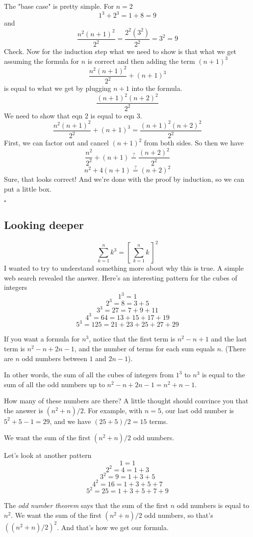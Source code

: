 \documentclass[11pt, oneside]{article}
\begin{document}
The "base case" is pretty simple.  For $n=2$
\[ 1^3 + 2^3 = 1 + 8 = 9 \]
and
\[ \frac{n^2(n+1)^2}{2^2} = \frac{2^2(3^2)}{2^2} = 3^2 = 9 \]
Check.  Now for the induction step what we need to show is that what we get assuming the formula for $n$ is correct and then adding the term $(n+1)^3$
\begin{equation}
\boxed{ \frac{n^2(n+1)^2}{2^2} + (n+1)^3}
\end{equation}
is equal to what we get by plugging $n+1$ into the formula.
\begin{equation}
\boxed{ \frac{(n+1)^2(n+2)^2}{2^2}}
\end{equation}
We need to show that eqn 2 is equal to eqn 3.  
\[ \frac{n^2(n+1)^2}{2^2} + (n+1)^3 = \frac{(n+1)^2(n+2)^2}{2^2} \]
First, we can factor out and cancel $(n+1)^2$ from both sides.  So then we have
\[ \frac{n^2}{2^2} + (n+1) \stackrel{?}{=} \frac{(n+2)^2}{2^2} \]
\[ n^2 + 4(n+1) \stackrel{?}{=} (n+2)^2 \]
Sure, that looks correct!  And we're done with the proof by induction, so we can put a little box.

$\square$

\subsection*{Looking deeper}
\[ \sum\limits_{k=1}^n k^3 = [\ \sum\limits_{k=1}^n k \ ] ^2 \]
I wanted to try to understand something more about why this is true.  A simple web search revealed the answer.  Here's an interesting pattern for the cubes of integers
\[ 1^3 = 1 \]
\[ 2^3 = 8 = 3 + 5 \]
\[ 3^3 = 27 = 7 + 9 + 11 \]
\[ 4^3 = 64 = 13 + 15 + 17 + 19 \]
\[ 5^3 = 125 = 21 + 23 + 25 + 27 + 29  \]

If you want a formula for $n^3$, notice that the first term is $n^2 - n + 1$ and the last term is $n^2 - n + 2n - 1$, and the number of terms for each sum equals $n$.  (There are $n$ odd numbers between $1$ and $2n-1$).

In other words, the sum of all the cubes of integers from $1^3$ to $n^3$ is equal to the sum of all the odd numbers up to $n^2 - n + 2n - 1 = n^2 + n - 1$.

How many of these numbers are there?  A little thought should convince you that the answer is $(n^2 + n)/2$.  For example, with $n=5$, our last odd number is $5^2 + 5 - 1 = 29$, and we have $(25 + 5)/2 = 15$ terms.

We want the sum of the first $(n^2 + n)/2$ odd numbers.

Let's look at another pattern
\[ 1 = 1 \]
\[ 2^2 = 4 = 1 + 3 \]
\[ 3^2 = 9 = 1 + 3 + 5 \]
\[ 4^2 = 16 = 1 + 3 + 5 + 7 \]
\[ 5^2 = 25 = 1 + 3 + 5 + 7 + 9 \]

The \emph{odd number theorem} says that the sum of the first $n$ odd numbers is equal to $n^2$.  We want the sum of the first $(n^2 + n)/2$ odd numbers, so that's $((n^2 + n)/2)^2$.  And that's how we get our formula.
\end{document}
